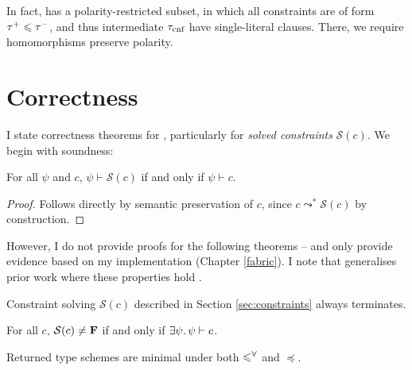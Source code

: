 In fact, \inference{} has a polarity-restricted subset, in which all constraints are of form $\tau^+ \leqslant \tau^-$, and thus intermediate $\tau_\text{cnf}$ have single-literal clauses. There, we require homomorphisms preserve polarity.

\needspace{6em}
\section{Correctness}
\label{sec:correctness}

I state correctness theorems for \inference{}, particularly for \emph{solved constraints} $\mathcal S(c)$. We begin with soundness:
\begin{theorem}[Soundness]
    For all $\psi$ and $c$, $\psi \vdash \mathcal S(c)$ if and only if $\psi \vdash c$.
\end{theorem}
\begin{proof}
    Follows directly by semantic preservation of $c$, since $c \leadsto^* \mathcal S(c)$ by construction.
\end{proof}

However, I do not provide proofs for the following theorems -- and only provide evidence based on my implementation (Chapter \ref{fabric}). I note that \inference{} generalises prior work where these properties hold \cite{simple-sub, mlstruct}. 

\begin{conjecture}[Termination]
    Constraint solving $\mathcal S(c)$ described in Section \ref{sec:constraints} always terminates.
\end{conjecture}

\begin{conjecture}[Completeness]    
    For all $c$, $\mathcal S(c) \ne \mathbf F$ if and only if $\exists \psi \ldotp \psi \vdash c$.
\end{conjecture}

\begin{conjecture}[Principality]
    Returned type schemes are minimal under both $\leqslant^\forall$ and $\preceq$.
\end{conjecture}

